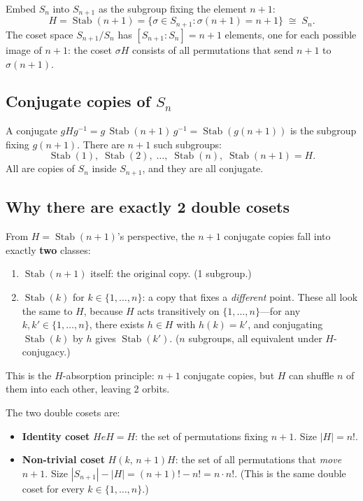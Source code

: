 \documentclass[12pt,a4paper]{article}
\theoremstyle{definition}
\theoremstyle{remark}
\newcommand{\Stab}{\operatorname{Stab}}
\begin{document}
Embed $S_n$ into $S_{n+1}$ as the subgroup fixing the element $n{+}1$:
\[
  H = \Stab(n{+}1) = \{\sigma \in S_{n+1} : \sigma(n{+}1) = n{+}1\}
  \;\cong\; S_n.
\]
The coset space $S_{n+1}/S_n$ has $[S_{n+1}:S_n] = n+1$ elements,
one for each possible image of $n{+}1$: the coset $\sigma H$ consists
of all permutations that send $n{+}1$ to $\sigma(n{+}1)$.

\subsection{Conjugate copies of $S_n$}

A conjugate $gHg^{-1} = g\,\Stab(n{+}1)\,g^{-1} = \Stab(g(n{+}1))$
is the subgroup fixing $g(n{+}1)$. There are $n{+}1$ such subgroups:
\[
  \Stab(1),\; \Stab(2),\; \ldots,\; \Stab(n),\; \Stab(n{+}1) = H.
\]
All are copies of $S_n$ inside $S_{n+1}$, and they are all conjugate.

\subsection{Why there are exactly 2 double cosets}

From $H = \Stab(n{+}1)$'s perspective, the $n{+}1$ conjugate copies
fall into exactly \textbf{two} classes:

\begin{enumerate}
\item $\Stab(n{+}1)$ itself: the original copy. (1 subgroup.)

\item $\Stab(k)$ for $k \in \{1, \ldots, n\}$: a copy that fixes a
  \emph{different} point. These all look the same to $H$, because $H$
  acts transitively on $\{1, \ldots, n\}$---for any $k, k' \in
  \{1, \ldots, n\}$, there exists $h \in H$ with $h(k) = k'$, and
  conjugating $\Stab(k)$ by $h$ gives $\Stab(k')$. ($n$ subgroups,
  all equivalent under $H$-conjugacy.)
\end{enumerate}

This is the $H$-absorption principle: $n{+}1$ conjugate copies, but
$H$ can shuffle $n$ of them into each other, leaving 2 orbits.

The two double cosets are:
\begin{itemize}
\item \textbf{Identity coset} $HeH = H$: the set of permutations
  fixing $n{+}1$. Size $|H| = n!$.
\item \textbf{Non-trivial coset} $H(k,\,n{+}1)H$: the set of all
  permutations that \emph{move} $n{+}1$. Size
  $|S_{n+1}| - |H| = (n+1)! - n! = n \cdot n!$.
  (This is the same double coset for every $k \in \{1,\ldots,n\}$.)
\end{itemize}
\end{document}
